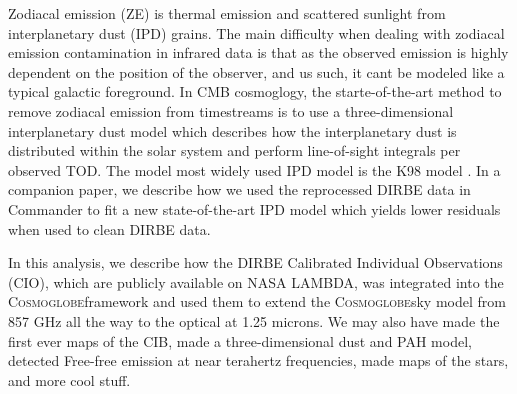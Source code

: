 \documentclass{aa}
\def\Cosmoglobe{\textsc{Cosmoglobe}}
\begin{document}
Zodiacal emission (ZE) is thermal emission and scattered sunlight from interplanetary dust (IPD) grains. The main difficulty when dealing with zodiacal emission contamination in infrared data is that as the observed emission is highly dependent on the position of the observer, and us such, it cant be modeled like a typical galactic foreground. In CMB cosmoglogy, the starte-of-the-art method to remove zodiacal emission from timestreams is to use a three-dimensional interplanetary dust model which describes how the interplanetary dust is distributed within the solar system and perform line-of-sight integrals per observed TOD. The model most widely used IPD model is the K98 model \citep{K98}. In a companion paper, we describe how we used the reprocessed DIRBE data in Commander to fit a new state-of-the-art IPD model which yields lower residuals when used to clean DIRBE data.

In this analysis, we describe how the DIRBE Calibrated Individual Observations (CIO), which are publicly available on NASA LAMBDA, was integrated into the \Cosmoglobe framework and used them to extend the \Cosmoglobe sky model from 857 GHz all the way to the optical at 1.25 microns. We may also have made the first ever maps of the CIB, made a three-dimensional dust and PAH model, detected Free-free emission at near terahertz frequencies, made maps of the stars, and more cool stuff.
\end{document}
